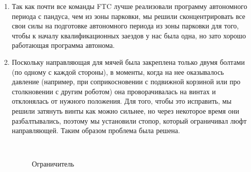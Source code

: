 \begin{enumerate}
	\item Так как почти все команды FTC лучше реализовали программу автономного периода с пандуса, чем из зоны парковки, мы решили сконцентрировать все свои силы на подготовке автономного периода из зоны парковки для того, чтобы к началу квалификационных заездов у нас была одна, но зато хорошо работающая программа автонома.
	
	\item Поскольку направляющая для мячей была закреплена только двумя болтами (по одному с каждой стороны), в моменты, когда на нее оказывалось давление (например, при соприкосновении с подвижной корзиной или про столкновении с другим роботом) она проворачивалась на винтах и отклонялась от нужного положения. Для того, чтобы это исправить, мы решили затянуть винты как можно сильнее, но через некоторое время они разбалтывались, поэтому мы установили стопор, который ограничивал люфт направляющей. Таким образом проблема была решена.
	\begin{figure}[H]
		\begin{minipage}[h]{0.2\linewidth}
			\center  
		\end{minipage}
		\begin{minipage}[h]{0.6\linewidth}
			\caption{Ограничитель}
		\end{minipage}
	\end{figure}
	
\end{enumerate}
\fillpage
